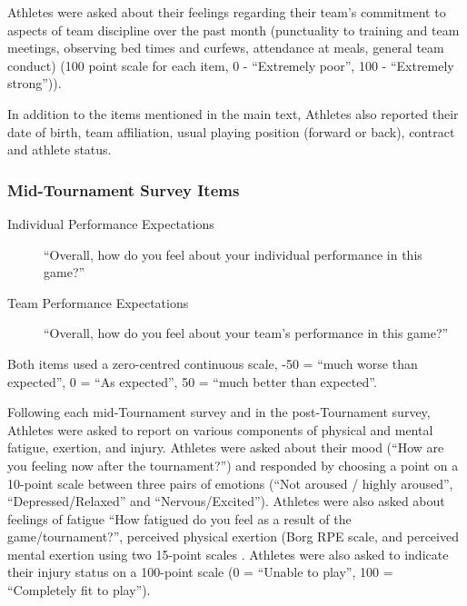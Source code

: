 \begin{CJK}{UTF8}{gbsn}
Athletes were asked about their feelings regarding their team's commitment to aspects of team discipline over the past month (punctuality to training and team meetings, observing bed times and curfews, attendance at meals, general team conduct) (100 point scale for each item, 0 - ``Extremely poor'', 100 - ``Extremely strong'')).


In addition to the items mentioned in the main text, Athletes also reported their date of birth, team affiliation, usual playing position (forward or back), contract and athlete status.






\subsubsection{Mid-Tournament Survey Items\label{app8:surveyMid}}

\begin{description}
\item [Individual Performance Expectations]``Overall, how do you feel about your individual performance in this game?''
\item [Team Performance Expectations] ``Overall, how do you feel about your team's performance in this game?''
\end{description}
Both items used a zero-centred continuous scale, -50 = ``much worse than expected'', 0 =  ``As expected'', 50 =  ``much better than expected''.

Following each mid-Tournament survey and in the post-Tournament survey, Athletes were asked to report on various components of physical and mental fatigue, exertion, and injury. Athletes were asked about their mood (``How are you feeling now after the tournament?'') and responded by choosing a point on a 10-point scale between three pairs of emotions (``Not aroused / highly aroused'',  ``Depressed/Relaxed'' and  ``Nervous/Excited'').  Athletes were also asked about feelings of fatigue ``How fatigued do you feel as a result of the game/tournament?'', perceived physical exertion (Borg RPE scale, \citep{Borg1990} and perceived mental exertion using two 15-point scales \citep[see][ ]{Noakes2012a}.  Athletes were also asked to indicate their injury status on a 100-point scale (0 = ``Unable to play'', 100 = ``Completely fit to play'').





\end{CJK}
